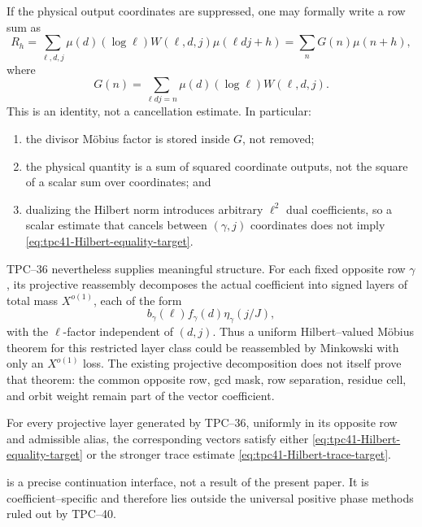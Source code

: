 If the physical output coordinates are suppressed, one may formally
write a row sum as
\begin{equation}
 R_h
 =\sum_{\ell,d,j}
   \mu(d)(\log\ell)W(\ell,d,j)
   \mu(\ell dj+h)
 =\sum_nG(n)\mu(n+h),
 \label{eq:tpc41-scalar-compression}
\end{equation}
where
\begin{equation}
 G(n)=\sum_{\ell dj=n}\mu(d)(\log\ell)W(\ell,d,j).
 \label{eq:tpc41-scalar-G}
\end{equation}
This is an identity, not a cancellation estimate.  In particular:
\begin{enumerate}[label=(\roman*)]
 \item the divisor M\"obius factor is stored inside \(G\), not removed;
 \item the physical quantity is a sum of squared coordinate outputs,
 not the square of a scalar sum over coordinates; and
 \item dualizing the Hilbert norm introduces arbitrary \(\ell^2\) dual
 coefficients, so a scalar estimate that cancels between \((\gamma,j)\)
 coordinates does not imply \eqref{eq:tpc41-Hilbert-equality-target}.
\end{enumerate}

TPC--36 nevertheless supplies meaningful structure.  For each fixed
opposite row \(\gamma\), its projective reassembly decomposes the actual
coefficient into signed layers of total mass \(X^{o(1)}\), each of the
form
\begin{equation}
 b_\gamma(\ell)f_\gamma(d)\eta_\gamma(j/J),
 \label{eq:tpc41-projective-layer}
\end{equation}
with the \(\ell\)-factor independent of \((d,j)\).  Thus a uniform
Hilbert--valued M\"obius theorem for this restricted layer class could be
reassembled by Minkowski with only an \(X^{o(1)}\) loss.  The existing
projective decomposition does not itself prove that theorem: the common
opposite row, gcd mask, row separation, residue cell, and orbit weight
remain part of the vector coefficient.

\begin{assumption}
\label{ass:tpc41-restricted-vector-input}
For every projective layer generated by TPC--36, uniformly in its
opposite row and admissible alias, the corresponding vectors satisfy
either \eqref{eq:tpc41-Hilbert-equality-target} or the stronger trace
estimate \eqref{eq:tpc41-Hilbert-trace-target}.
\end{assumption}

 is a precise continuation
interface, not a result of the present paper.  It is coefficient--specific
and therefore lies outside the universal positive phase methods ruled out
by TPC--40.
